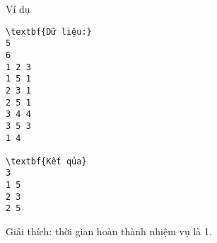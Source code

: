 Ví dụ
\begin{verbatim}
\textbf{Dữ liệu:}
5
6
1 2 3
1 5 1
2 3 1
2 5 1
3 4 4
3 5 3
1 4

\textbf{Kết qủa}
3
1 5
2 3
2 5
\end{verbatim}

   Giải thích: thời gian hoàn thành nhiệm vụ là 1.